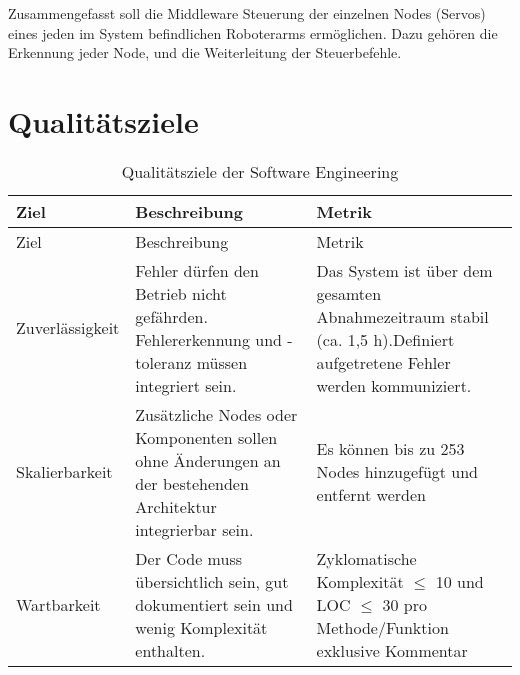 Zusammengefasst soll die Middleware Steuerung der einzelnen Nodes (Servos) eines jeden im System befindlichen Roboterarms ermöglichen. Dazu gehören die Erkennung jeder Node, und die Weiterleitung der Steuerbefehle.

\newpage
\section{Qualitätsziele}
\begin{longtable}{|>{\raggedright\arraybackslash}p{4cm}|>{\raggedright\arraybackslash}p{5cm}|>{\raggedright\arraybackslash}p{5cm}|}
	\caption{Qualitätsziele der Software Engineering} \label{tab:seziele} \\
	\hline
	Ziel & Beschreibung & Metrik \\
	\hline
	\endfirsthead
	
	\hline
	Ziel & Beschreibung & Metrik \\
	\hline
	\endhead
	
	\hline
	\endfoot
	
	
	Zuverlässigkeit & 
	Fehler dürfen den Betrieb nicht gefährden. Fehlererkennung und -toleranz müssen integriert sein.
	& Das System ist über dem gesamten Abnahmezeitraum stabil (ca. 1,5 h).Definiert aufgetretene Fehler werden kommuniziert.
	\\
	\hline
	Skalierbarkeit & 
	Zusätzliche Nodes oder Komponenten sollen ohne Änderungen an der bestehenden Architektur integrierbar sein. 
	& Es können bis zu 253 Nodes hinzugefügt und entfernt werden
	\\
	\hline
	Wartbarkeit & 
	Der Code muss übersichtlich sein, gut dokumentiert sein und wenig Komplexität enthalten. 
	& Zyklomatische Komplexität $\leq$ 10 und LOC $\leq$ 30 pro Methode/Funktion exklusive Kommentar  
	
	\\
	\hline
	

\end{longtable}
